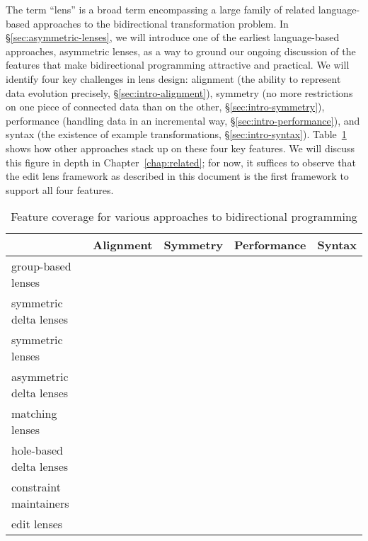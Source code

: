 The term ``lens'' is a broad term encompassing a large family of related
language-based approaches to the bidirectional transformation problem.
In \S\ref{sec:asymmetric-lenses}, we will introduce one of the earliest
language-based approaches, asymmetric lenses, as a way to ground our ongoing
discussion of the features that make bidirectional programming attractive
and practical. We will identify four key challenges in lens design:
alignment (the ability to represent data evolution precisely,
\S\ref{sec:intro-alignment}), symmetry (no more restrictions on one piece of
connected data than on the other, \S\ref{sec:intro-symmetry}), performance
(handling data in an incremental way, \S\ref{sec:intro-performance}), and
syntax (the existence of example transformations, \S\ref{sec:intro-syntax}).
Table~\ref{tab:related-work-matrix} shows how other approaches stack up on
these four key features. We will discuss this figure in depth in
Chapter~\ref{chap:related}; for now, it suffices to observe that the edit
lens framework as described in this document is the first framework to
support all four features.

\begin{table}
    \begin{center}
    \begin{tabular}{l|cccc}
        & Alignment & Symmetry & Performance & Syntax \\
        \hline
        group-based lenses      &\Y&\N&\N&\N\\
        symmetric delta lenses  &\Y&\Y&\N&\N\\
        symmetric lenses        &\N&\Y&\N&\Y\\
        asymmetric delta lenses &\Y&\N&\N&\Y\\
        matching lenses         &\Y&\N&\N&\Y\\
        hole-based delta lenses &\Y&\N&\N&\Y\\
        constraint maintainers  &\Y&\Y&\N&\Y\\
        edit lenses             &\Y&\Y&\Y&\Y\\
    \end{tabular}
    \end{center}
    \caption{Feature coverage for various approaches to bidirectional
    programming}
    \label{tab:related-work-matrix}
\end{table}

